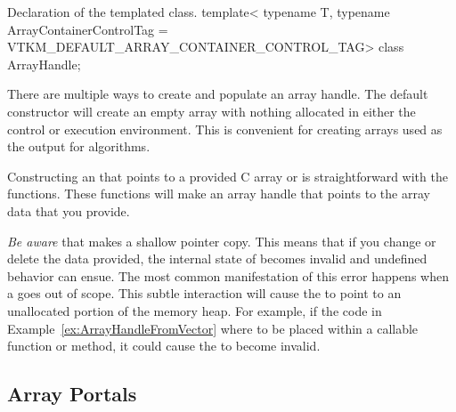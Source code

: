\begin{vtkmexample}{Declaration of the \protect{} templated class.}
template<
    typename T,
    typename ArrayContainerControlTag = VTKM_DEFAULT_ARRAY_CONTAINER_CONTROL_TAG>
class ArrayHandle;
\end{vtkmexample}

There are multiple ways to create and populate an array handle. The default
 constructor will create an empty array with nothing
allocated in either the control or execution environment. This is
convenient for creating arrays used as the output for algorithms.


Constructing an  that points to a provided C array or
 is straightforward with the
 functions. These functions will make an array
handle that points to the array data that you provide.



\emph{Be aware} that  makes a shallow pointer
copy. This means that if you change or delete the data provided, the
internal state of  becomes invalid and undefined
behavior can ensue. The most common manifestation of this error happens
when a  goes out of scope. This subtle interaction
will cause the  to point to an unallocated portion of
the memory heap. For example, if the code in
Example~\ref{ex:ArrayHandleFromVector} where to be placed within a callable
function or method, it could cause the  to become
invalid.


\subsection{Array Portals}
\label{sec:ArrayPortals}


